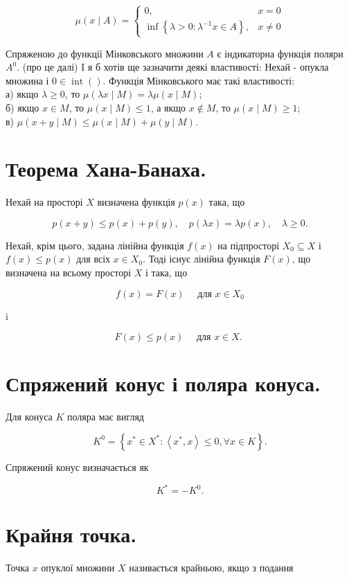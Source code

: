 \documentclass[10pt]{article}
\begin{document}
$$
\mu(x \mid A)= \begin{cases}0, & x=0 \\ \inf \left\{\lambda>0: \lambda^{-1} x \in A\right\}, & x \neq 0\end{cases}
$$

Спряженою до функції Мінковського множини $A$ є індикаторна функція поляри $A^{0}$. (про це далі) I я б хотів ще зазначити деякі властивості: Нехай - опукла множина і $0 \in \operatorname{int}()$. Функція Мінковського має такі властивості:\\
а) якщо $\lambda \geq 0$, то $\mu(\lambda x \mid M)=\lambda \mu(x \mid M)$;\\
б) якщо $x \in M$, то $\mu(x \mid M) \leq 1$, а якщо $x \notin M$, то $\mu(x \mid M) \geq 1$;\\
в) $\mu(x+y \mid M) \leq \mu(x \mid M)+\mu(y \mid M)$.

\section*{Теорема Хана-Банаха.}
Нехай на просторі $X$ визначена функція $p(x)$ така, що

$$
p(x+y) \leq p(x)+p(y), \quad p(\lambda x)=\lambda p(x), \quad \lambda \geq 0 .
$$

Нехай, крім цього, задана лінійна функція $f(x)$ на підпросторі $X_{0} \subseteq X$ і $f(x) \leq p(x)$ для всіх $x \in X_{0}$. Тоді існує лінійна функція $F(x)$, що визначена на всьому просторі $X$ і така, що

$$
f(x)=F(x) \quad \text { для } x \in X_{0}
$$

i

$$
F(x) \leq p(x) \quad \text { для } x \in X \text {. }
$$

\section*{Спряжений конус і поляра конуса.}
Для конуса $K$ поляра має вигляд

$$
K^{0}=\left\{x^{*} \in X^{*}:\left\langle x^{*}, x\right\rangle \leq 0, \forall x \in K\right\} .
$$

Спряжений конус визначається як

$$
K^{*}=-K^{0} .
$$

\section*{Крайня точка.}
Точка $x$ опуклої множини $X$ називається крайньою, якщо з подання
\end{document}
